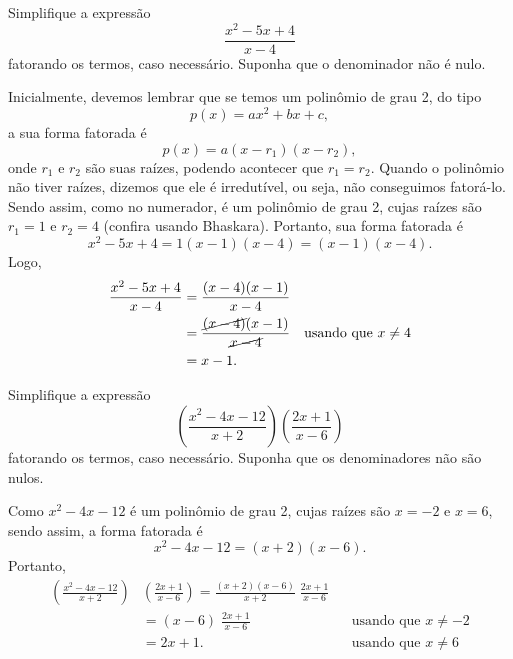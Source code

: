 \begin{example}
  Simplifique a expressão
  \[
    \frac{x^2-5x+4}{x-4}
  \]
  fatorando os termos, caso necessário.
  Suponha que o denominador não é nulo.

  \solution
  Inicialmente, devemos lembrar que se temos um polinômio de grau 2, do tipo
  \[
    p(x) = ax^2 + bx + c,
  \]
  a sua forma fatorada é
  \[
    p(x) = a(x-r_1)(x-r_2),
  \]
  onde $r_1$ e $r_2$ são suas raízes, podendo acontecer que $r_1=r_2$.
  Quando o polinômio não tiver raízes, dizemos que ele é irredutível, ou seja,
  não conseguimos fatorá-lo. Sendo assim, como no numerador, é um polinômio de
  grau 2, cujas raízes são $r_1=1$ e $r_2=4$ (confira usando Bhaskara). Portanto,
  sua forma fatorada é
  \[
    x^2 - 5x + 4
    = 1(x-1)(x-4)
    = (x-1)(x-4).
  \]
  Logo,
  \begin{align*}
    \frac{x^2-5x+4}{x-4}
    & = \frac{(x-4)(x-1)}{x-4}  \\
    & = \frac{\cancel{(x-4)}(x-1)}{\cancel{x-4}} & \text{usando que } x \neq 4 \\
    & = x-1.
  \end{align*}
\end{example}

\begin{example}
  Simplifique a expressão
  \[
    \left(\frac{x^2-4x-12}{x+2} \right) \left( \frac{2x+1}{x-6}\right)
  \]
  fatorando os termos, caso necessário.
  Suponha que os denominadores não são nulos.

  \solution
  Como $x^2-4x-12$ é um polinômio de grau 2, cujas raízes são $x=-2$ e
  $x=6$, sendo assim, a forma fatorada é
  \[
    x^2 - 4x - 12 = (x+2)(x-6).
  \]
  Portanto,
  \begin{align*}
    \left(   \frac{x^2-4x-12}{x+2} \right)
    & \left( \frac{2x+1}{x-6}      \right)
    = \frac{(x+2)(x-6)}{x+2} \; \frac{2x+1}{x-6}       \\
    & = (x-6)
      \; \frac{2x+1}{x-6} & & \text{usando que } x \neq -2   \\
    & = 2x + 1.             & & \text{usando que } x \neq  6
  \end{align*}
\end{example}

